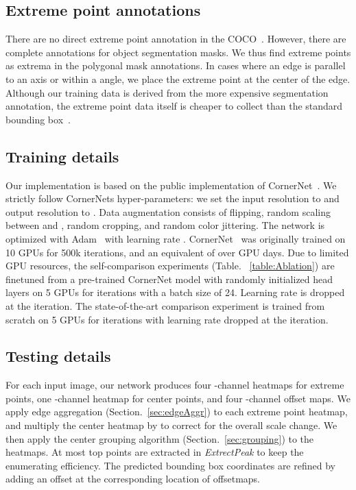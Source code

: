 \documentclass[10pt,twocolumn,letterpaper]{article}
\begin{document}
\subsection{Extreme point annotations}

There are no direct extreme point annotation in the COCO~\cite{lin2014microsoft}.
However, there are complete annotations for object segmentation masks.
We thus find extreme points as extrema in the polygonal mask annotations.
In cases where an edge is parallel to an axis or within a  angle, we place the extreme point at the center of the edge.
Although our training data is derived from the more expensive segmentation annotation, the extreme point data itself is  cheaper to collect than the standard bounding box~\cite{papadopoulos2017extreme}.

\subsection{Training details}

Our implementation is based on the public implementation of CornerNet~\cite{Law_2018_ECCV}.
We strictly follow CornerNets hyper-parameters:
we set the input resolution to  and output resolution to . 
Data augmentation consists of flipping, random scaling between  and , random cropping, and random color jittering.
The network is optimized with Adam~\cite{kingma2014adam} with learning rate . 
CornerNet~\cite{Law_2018_ECCV} was originally trained on 10 GPUs for 500k iterations, and an equivalent of over  GPU days.
Due to limited GPU resources, the self-comparison experiments (Table. ~\ref{table:Ablation}) are finetuned from a pre-trained CornerNet model with randomly initialized head layers on 5 GPUs for  iterations with a batch size of 24. 
Learning rate is dropped  at the  iteration.
The state-of-the-art comparison experiment is trained from scratch on 5 GPUs for  iterations with learning rate dropped at the  iteration.

\subsection{Testing details}
For each input image, our network produces four -channel heatmaps for extreme points, one -channel heatmap for center points, and four -channel offset maps. 
We apply edge aggregation (Section.~\ref{sec:edgeAggr}) to each extreme point heatmap, and multiply the center heatmap by  to correct for the overall scale change. 
We then apply the center grouping algorithm (Section.~\ref{sec:grouping}) to the heatmaps.
At most  top points are extracted in \emph{ExtrectPeak} to keep the enumerating efficiency. 
The predicted bounding box coordinates are refined by adding an offset at the corresponding location of offsetmaps. 
\end{document}
